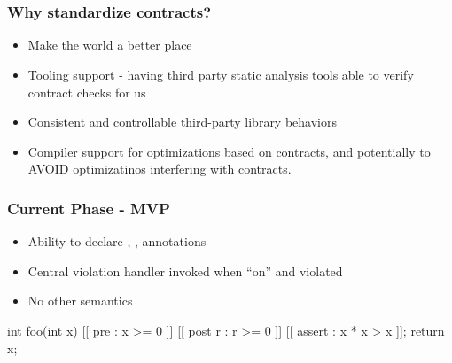 
\section{}
\begin{frame}[fragile]
  \frametitle{Why standardize contracts?}
\begin{itemize}

\item Make the world a better place
\item Tooling support - having third party static analysis tools able to
  verify contract checks for us
\item Consistent and controllable third-party library behaviors
\item Compiler support for optimizations based on contracts, and
  potentially to AVOID optimizatinos interfering with contracts.
\end{itemize}
\end{frame}

\begin{frame}[fragile]
  \frametitle{Current Phase - MVP}

  \begin{itemize}
  \item Ability to declare \cc{[[pre]]}, \cc{[[post]]}, \cc{[[assert]]} annotations
  \item Central violation handler invoked when ``on'' and violated
  \item No other semantics
  \end{itemize}

  \begin{cppcodebox}
  int foo(int x)
    [[ pre : x >= 0 ]]
    [[ post r : r >= 0 ]]
  {
    [[ assert : x * x > x ]];
    return x;
  }
  \end{cppcodebox}

\end{frame}

